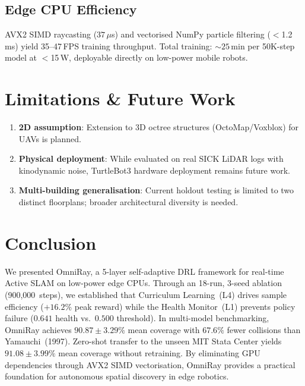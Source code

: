 \documentclass[conference]{IEEEtran}
\begin{document}
\subsection{Edge CPU Efficiency}
AVX2 SIMD raycasting ($37\,\mu$s) and vectorised NumPy particle filtering ($<$1.2\,ms) yield 35--47\,FPS training throughput.
Total training: ${\sim}25$\,min per 50K-step model at $<$15\,W, deployable directly on low-power mobile robots.

\section{Limitations \& Future Work}
\begin{enumerate}
    \item \textbf{2D assumption}: Extension to 3D octree structures (OctoMap/Voxblox) for UAVs is planned.
    \item \textbf{Physical deployment}: While evaluated on real SICK LiDAR logs with kinodynamic noise, TurtleBot3 hardware deployment remains future work.
    \item \textbf{Multi-building generalisation}: Current holdout testing is limited to two distinct floorplans; broader architectural diversity is needed.
\end{enumerate}

\section{Conclusion}
We presented OmniRay, a 5-layer self-adaptive DRL framework for real-time Active SLAM on low-power edge CPUs.
Through an 18-run, 3-seed ablation (900{,}000~steps), we established that Curriculum Learning~(L4) drives sample efficiency ($+16.2\%$ peak reward) while the Health Monitor~(L1) prevents policy failure ($0.641$ health vs.\ $0.500$ threshold).
In multi-model benchmarking, OmniRay achieves $90.87 \pm 3.29\%$ mean coverage with $67.6\%$ fewer collisions than Yamauchi~(1997).
Zero-shot transfer to the unseen MIT Stata Center yields $91.08 \pm 3.99\%$ mean coverage without retraining.
By eliminating GPU dependencies through AVX2 SIMD vectorisation, OmniRay provides a practical foundation for autonomous spatial discovery in edge robotics.
\end{document}
